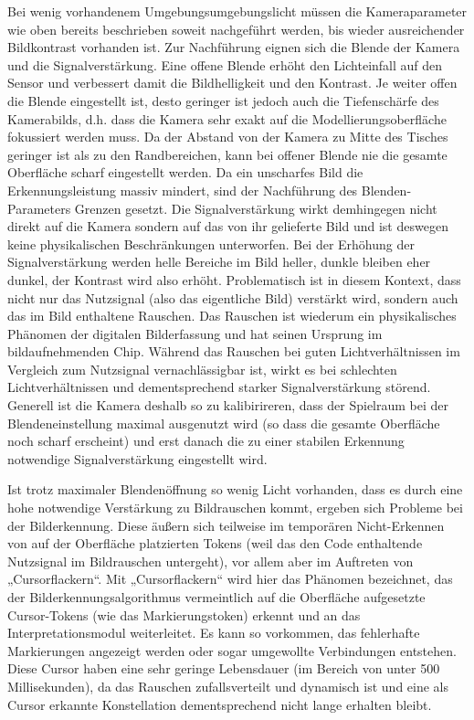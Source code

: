 Bei wenig vorhandenem Umgebungsumgebungslicht müssen die Kameraparameter wie oben bereits beschrieben soweit nachgeführt werden, bis wieder ausreichender Bildkontrast vorhanden ist. Zur Nachführung eignen sich die Blende der Kamera und die Signalverstärkung. Eine offene Blende erhöht den Lichteinfall auf den Sensor und verbessert damit die Bildhelligkeit und den Kontrast. Je weiter offen die Blende eingestellt ist, desto geringer ist jedoch auch die Tiefenschärfe des Kamerabilds, d.h. dass die Kamera sehr exakt auf die Modellierungsoberfläche fokussiert werden muss. Da der Abstand von der Kamera zu Mitte des Tisches geringer ist als zu den Randbereichen, kann bei offener Blende nie die gesamte Oberfläche scharf eingestellt werden. Da ein unscharfes Bild die Erkennungsleistung massiv mindert, sind der Nachführung des Blenden-Parameters Grenzen gesetzt. Die Signalverstärkung wirkt demhingegen nicht direkt auf die Kamera sondern auf das von ihr gelieferte Bild und ist deswegen keine physikalischen Beschränkungen unterworfen. Bei der Erhöhung der Signalverstärkung werden helle Bereiche im Bild heller, dunkle bleiben eher dunkel, der Kontrast wird also erhöht. Problematisch ist in diesem Kontext, dass nicht nur das Nutzsignal (also das eigentliche Bild) verstärkt wird, sondern auch das im Bild enthaltene Rauschen. Das Rauschen ist wiederum ein physikalisches Phänomen der digitalen Bilderfassung und hat seinen Ursprung im bildaufnehmenden Chip. Während das Rauschen bei guten Lichtverhältnissen im Vergleich zum Nutzsignal vernachlässigbar ist, wirkt es bei schlechten Lichtverhältnissen und dementsprechend starker Signalverstärkung störend. Generell ist die Kamera deshalb so zu kalibirireren, dass der Spielraum bei der Blendeneinstellung maximal ausgenutzt wird (so dass die gesamte Oberfläche noch scharf erscheint) und erst danach die zu einer stabilen Erkennung notwendige Signalverstärkung eingestellt wird.

Ist trotz maximaler Blendenöffnung so wenig Licht vorhanden, dass es durch eine hohe notwendige Verstärkung zu Bildrauschen kommt, ergeben sich Probleme bei der Bilderkennung. Diese äußern sich teilweise im temporären Nicht-Erkennen von auf der Oberfläche platzierten Tokens (weil das den Code enthaltende Nutzsignal im Bildrauschen untergeht), vor allem aber im Auftreten von „Cursorflackern“. Mit „Cursorflackern“ wird hier das Phänomen bezeichnet, das der Bilderkennungsalgorithmus vermeintlich auf die Oberfläche aufgesetzte Cursor-Tokens (wie das Markierungstoken) erkennt und an das Interpretationsmodul weiterleitet. Es kann so vorkommen, das fehlerhafte Markierungen angezeigt werden oder sogar umgewollte Verbindungen entstehen. Diese Cursor haben eine sehr geringe Lebensdauer (im Bereich von unter 500 Millisekunden), da das Rauschen zufallsverteilt und dynamisch ist und eine als Cursor erkannte Konstellation dementsprechend nicht lange erhalten bleibt. 

